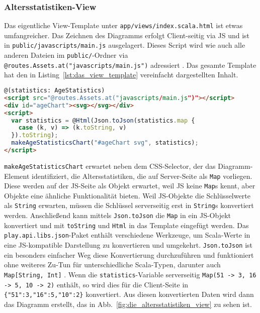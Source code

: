 
\subsubsection{Altersstatistiken-View} %
\label{ssub:altersstatistiken_view}

Das eigentliche View-Template unter \lstinline|app/views/index.scala.html| ist etwas umfangreicher.
Das Zeichnen des Diagramms erfolgt Client-seitig via JS und ist in \lstinline|public/javascripts/main.js| ausgelagert.
Dieses Script wird wie auch alle anderen Dateien im \lstinline|public/|-Ordner via \lstinline|@routes.Assets.at("javascripts/main.js")| adressiert \cite[vgl.][S.~111]{play_for_scala}.
Das gesamte Template hat den in Listing~\ref{lst:das_view_template} vereinfacht dargestellten Inhalt.

\begin{lstlisting}[language=html,caption=Das View-Template, label=lst:das_view_template]
@(statistics: AgeStatistics)
<script src="@routes.Assets.at("javascripts/main.js")"></script>
<div id="ageChart"><svg></svg></div>
<script>
  var statistics = @Html(Json.toJson(statistics.map {
    case (k, v) => (k.toString, v)
  }).toString);
  makeAgeStatisticsChart("#ageChart svg", statistics);
</script>
\end{lstlisting}

\lstinline|makeAgeStatisticsChart| erwartet neben dem CSS-Selector, der das Diagramm-Element identifiziert, die Altersstatistiken, die auf Server-Seite als \lstinline|Map| vorliegen.
Diese werden auf der JS-Seite als Objekt erwartet, weil JS keine \lstinline|Map|s kennt, aber Objekte eine ähnliche Funktionalität bieten.
Weil JS-Objekte die Schlüsselwerte als \lstinline|String| erwarten, müssen die Schlüssel serverseitig erst in \lstinline|String|s konvertiert werden.
Anschließend kann mittels \lstinline|Json.toJson| die \lstinline|Map| in ein JS-Objekt konvertiert und mit \lstinline|toString| und \lstinline|Html| in das Template eingefügt werden.
Das \lstinline|play.api.libs.json|-Paket enthält verschiedene Werkzeuge, um Scala-Werte in eine JS-kompatible Darstellung zu konvertieren und umgekehrt.
\lstinline|Json.toJson| ist ein besonders einfacher Weg diese Konvertierung durchzuführen und funktioniert ohne weiteres Zu-Tun für unterschiedliche Scala-Typen, darunter auch \lstinline|Map[String, Int]| \cite[vgl.][S.~214--215]{play_for_scala}.
Wenn die \lstinline|statistics|-Variable serverseitig \lstinline|Map(51 -> 3, 16 -> 5, 10 -> 2)| enthält, so wird dies für die Client-Seite in \lstinline|{"51":3,"16":5,"10":2}| konvertiert.
Aus diesen konvertierten Daten wird dann das Diagramm erstellt, das in Abb.~\ref{fig:die_altersstatistiken_view} zu sehen ist.

